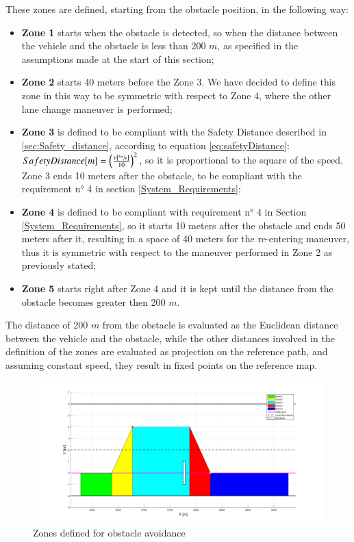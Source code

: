 These zones are defined, starting from the obstacle position, in the following way:
\begin{itemize}
    \item \textbf{Zone 1} starts when the obstacle is detected, so when the distance between the vehicle and the obstacle is less than 200 $m$, as specified in the assumptions made at the start of this section;
    \item \textbf{Zone 2} starts 40 meters before the Zone 3. We have decided to define this zone in this way to be symmetric with respect to Zone 4, where the other lane change maneuver is performed;
    \item \textbf{Zone 3} is defined to be compliant with the Safety Distance described in \ref{sec:Safety_distance}, according to equation \ref{eq:safetyDistance}: $SafetyDistance [m] = \left(\frac{v[\sfrac{km}{h}]}{10}\right)^2$, so it is proportional to the square of the speed. Zone 3 ends 10 meters after the obstacle, to be compliant with the requirement n° 4 in section \ref{System_Requirements};
    \item \textbf{Zone 4} is defined to be compliant with requirement n° 4 in Section \ref{System_Requirements}, so it starts 10 meters after the obstacle and ends 50 meters after it, resulting in a space of 40 meters for the re-entering maneuver, thus it is symmetric with respect to the maneuver performed in Zone 2 as previously stated;
    \item \textbf{Zone 5} starts right after Zone 4 and it is kept until the distance from the obstacle becomes greater then 200 $m$.
\end{itemize}
The distance of 200 $m$ from the obstacle is evaluated as the Euclidean distance between the vehicle and the obstacle, while the other distances involved in the definition of the zones are evaluated as projection on the reference path, and assuming constant speed, they result in fixed points on the reference map.
\begin{figure}[H]
    \centering
    \includegraphics[width=1\textwidth]{Figures/Zones.png}
    \caption{Zones defined for obstacle avoidance}
      \label{fig:Zones}
\end{figure}
